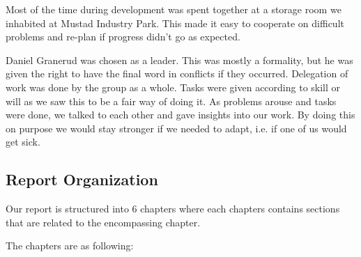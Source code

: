 Most of the time during development was spent together at a storage room we
inhabited at Mustad Industry Park. This made it easy to cooperate on difficult
problems and re-plan if progress didn’t go as expected.

Daniel Granerud was chosen as a leader. This was mostly a formality, but he was
given the right to have the final word in conflicts if they occurred.
Delegation of work was done by the group as a whole. Tasks were given according
to skill or will as we saw this to be a fair way of doing it. As problems
arouse and tasks were done, we talked to each other and gave insights into our
work. By doing this on purpose we would stay stronger if we needed to adapt,
i.e. if one of us would get sick.


\subsection{Report Organization}
\label{subsec:report_organization}

Our report is structured into 6 chapters where each chapters contains sections that are related to the encompassing chapter.

The chapters are as following:

